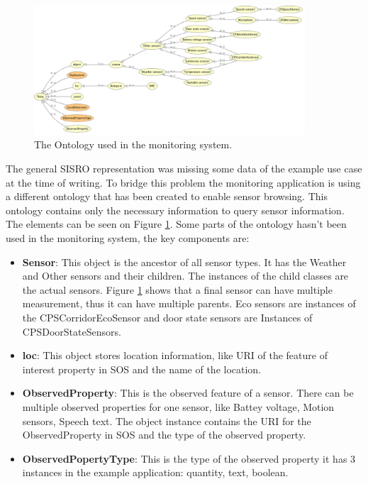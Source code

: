 \begin{figure}[h]
\centering
\includegraphics[width=0.9\textwidth]{figures/implrdf.png}
\caption{The Ontology used in the monitoring system.\label{fig:implrdf}}
\end{figure}

The general SISRO representation was missing some data of the example use case at the time of writing. To bridge this problem the monitoring application is using a different ontology that has been created to enable sensor browsing. This ontology contains only the necessary information to query sensor information. The elements can be seen on Figure \ref{fig:implrdf}. Some parts of the ontology hasn't been used in the monitoring system, the key components are:

\begin{itemize}
\item \textbf{Sensor}: This object is the ancestor of all sensor types. It has the Weather and Other sensors and their children. The instances of the child classes are the actual sensors. Figure \ref{fig:implrdf} shows that a final sensor can have multiple measurement, thus it can have multiple parents. Eco sensors are instances of the CPSCorridorEcoSensor and door state sensors are Instances of CPSDoorStateSensors. 
\item \textbf{loc}: This object stores location information, like URI of the feature of interest property in SOS and the name of the location. 
\item \textbf{ObservedProperty}: This is the observed feature of a sensor. There can be multiple observed properties for one sensor, like Battey voltage, Motion sensors, Speech text. The object instance contains the URI for the ObservedProperty in SOS and the type of the observed property.
\item \textbf{ObservedPopertyType}: This is the type of the observed property it has 3 instances in the example application: quantity, text, boolean.
\end{itemize}
 
